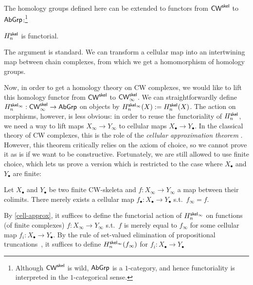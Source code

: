 \documentclass[a4page]{article}
\begin{document}
The homology groups defined here can be extended to functors from \( \textnormal{\ensuremath{\mathsf{CW}^{\mathsf{skel}}}} \)
to \( \textnormal{\ensuremath{\mathsf{AbGrp}}} \):\footnote{Although \( \textnormal{\ensuremath{\mathsf{CW}^{\mathsf{skel}}}} \) is wild, \( \textnormal{\ensuremath{\mathsf{AbGrp}}} \) is a $1$-category, and hence functoriality is interpreted in the $1$-categorical sense.}
%
\begin{proposition}
  $\textnormal{\ensuremath{H^{\mathsf{skel}}_{n}}}$ is functorial.
\end{proposition}
The argument is standard. We can transform a cellular map into an intertwining map
  between chain complexes, from which we get a homomorphism of homology groups.

Now, in order to get a homology theory on CW complexes, we would like to lift
this homology functor from $\textnormal{\ensuremath{\mathsf{CW}^{\mathsf{skel}}}}$ to $\textnormal{\ensuremath{\mathsf{CW}_\infty^{\mathsf{skel}}}}$.
%
We can straightforwardly define $\textnormal{\ensuremath{H^{\mathsf{skel}_\infty}_{n}}} : \textnormal{\ensuremath{\mathsf{CW}_\infty^{\mathsf{skel}}}} \to \textnormal{\ensuremath{\mathsf{AbGrp}}}$ on
objects by $\textnormal{\ensuremath{H^{\mathsf{skel}_\infty}_{n}}}(X) := H_n^{\mathsf{skel}}(X)$. The action on
morphisms, however, is less obvious: in order to reuse the functoriality of $\textnormal{\ensuremath{H^{\mathsf{skel}}_{n}}}$,
we need a way to lift maps $X_\infty \to Y_\infty$ to cellular maps
$X_\bullet \to Y_\bullet$.
%
In the classical theory of CW complexes, this is the role of the \emph{cellular
approximation theorem} \cite[Section 10.4]{May1999}.
%
However, this theorem critically relies on the axiom of choice, so we cannot prove it as is if we want to be constructive.
%
Fortunately, we are still allowed to use finite choice, which lets us prove a
version which is restricted to the case where $X_\bullet$ and $Y_\bullet$ are
finite:
%
\begin{theorem}\label{cell-approx}
  Let $X_\bullet$ and $Y_\bullet$ be two finite CW-skeleta and
  $f : X_{\infty} \to Y_{\infty}$ a map between their colimits.
  There merely exists a cellular map $f_\bullet : X_\bullet \to Y_\bullet$ s.t.\ $f_\infty = f$.
\end{theorem}
%
By \cref{cell-approx}, it suffices to define the functorial action of
$\textnormal{\ensuremath{H^{\mathsf{skel}_\infty}_{n}}}$ on functions (of finite complexes) $f : X_\infty \to Y_\infty$
s.t.\ $f$ is merely equal to $f_\infty$ for some cellular map
$f_i : X_\bullet \to Y_\bullet$.
%
By the rule of set-valued elimination of propositional truncations~\cite[Proposition 2]{KrausTruncation}, it
suffices to define $\textnormal{\ensuremath{H^{\mathsf{skel}_\infty}_{n}}}(f_\infty)$ for $f_i : X_\bullet \to Y_\bullet$
\end{document}
